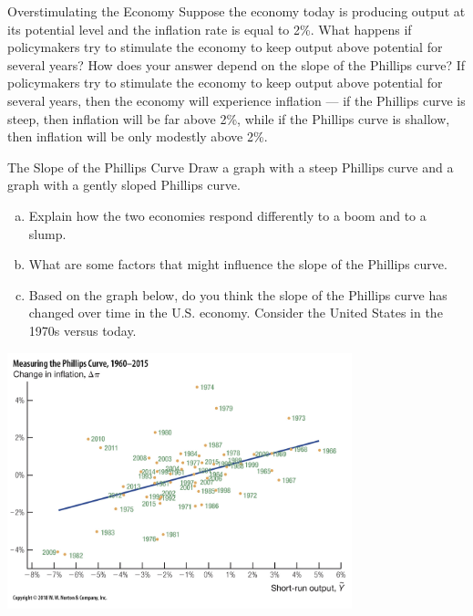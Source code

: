 \documentclass[8pt]{extarticle}
\title{}
\author{Avinash Iyer}
\date{}
\begin{document}
  \begin{problem}{Overstimulating the Economy}
    Suppose the economy today is producing output at its potential level and the inflation rate is equal to 2\%. What happens if policymakers try to stimulate the economy to keep output above potential for several years? How does your answer depend on the slope of the Phillips curve?
    \tcblower
    If policymakers try to stimulate the economy to keep output above potential for several years, then the economy will experience inflation --- if the Phillips curve is steep, then inflation will be far above 2\%, while if the Phillips curve is shallow, then inflation will be only modestly above 2\%.
  \end{problem}
  \begin{problem}{The Slope of the Phillips Curve}
    Draw a graph with a steep Phillips curve and a graph with a gently sloped Phillips curve.
    \begin{enumerate}[(a)]
      \item Explain how the two economies respond differently to a boom and to a slump.
      \item What are some factors that might influence the slope of the Phillips curve.
      \item Based on the graph below, do you think the slope of the Phillips curve has changed over time in the U.S. economy. Consider the United States in the 1970s versus today.
    \end{enumerate}
    \begin{center}
      \includegraphics[width=10cm]{ps6_phillipscurveexample}
    \end{center}
    \tcblower
    \begin{center}
\end{center}
\end{problem}
\end{document}

